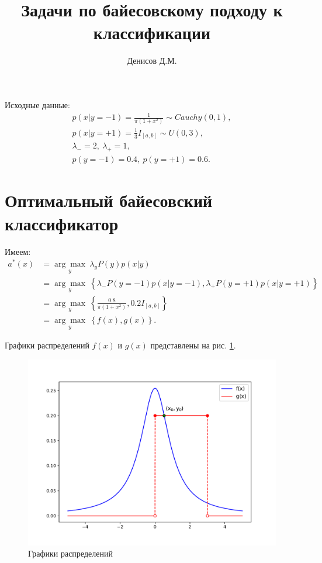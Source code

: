 \documentclass[14pt,a4paper]{article}
\title{Задачи по байесовскому подходу к классификации}
\author{Денисов Д.М.}
\date{}
\begin{document}
    \maketitle

    Исходные данные:
    \[
        \begin{gathered}
            p(x | y = -1) = \frac{1}{\pi (1 + x^2)} \sim Cauchy(0, 1), \\
            p(x | y = +1) = \frac{1}{3} I_{[a, b]} \sim U(0, 3), \\
            \lambda_{-} = 2, \ \lambda_{+} = 1, \\
            p(y = -1) =  0.4, \ p(y = +1) = 0.6.
        \end{gathered}
    \]

    \section{Оптимальный байесовский классификатор}

    Имеем:
    \[
        \begin{aligned}
            a^*(x) &= \underset{y}{\arg\!\max} \ \lambda_y P(y) p(x | y) \\
            &= \underset{y}{\arg\!\max} \ \left\{ \lambda_{-} P(y = -1) p(x | y = -1), \lambda_{+} P(y = +1) p(x | y = +1) \right\} \\
            &= \underset{y}{\arg\!\max} \ \left\{ \frac{0.8}{\pi (1 + x^2)}, 0.2 I_{[a, b]} \right\} \\
            &= \underset{y}{\arg\!\max} \ \left\{ f(x), g(x) \right\}.
        \end{aligned}
    \]

    Графики распределений $f(x)$ и $g(x)$ представлены на рис. \ref{fig:distribs}.
    \begin{figure}[h]
        \centering
        \includegraphics[width=\textwidth]{distribs.pdf}
        \caption{Графики распределений}
        \label{fig:distribs}
    \end{figure}
\end{document}
